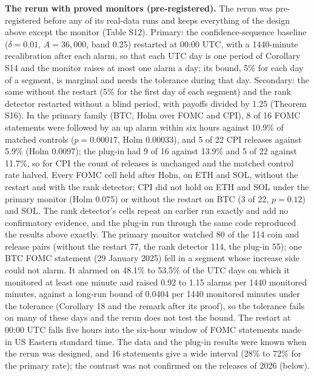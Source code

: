 \documentclass[
]{article}
\begin{document}
\textbf{The rerun with proved monitors (pre-registered).} The rerun was
pre-registered before any of its real-data runs and keeps everything of
the design above except the monitor (Table S12). Primary: the
confidence-sequence baseline (\(\delta = 0.01\), \(A = 36{,}000\), band
0.25) restarted at 00:00 UTC, with a 1440-minute recalibration after
each alarm, so that each UTC day is one period of Corollary S14 and the
monitor raises at most one alarm a day; its bound, 5\% for each day of a
segment, is marginal and needs the tolerance during that day. Secondary:
the same without the restart (5\% for the first day of each segment) and
the rank detector restarted without a blind period, with payoffs divided
by 1.25 (Theorem S16). In the primary family (BTC, Holm over FOMC and
CPI), 8 of 16 FOMC statements were followed by an up alarm within six
hours against 10.9\% of matched controls (\(p = 0.00017\), Holm
0.00033), and 5 of 22 CPI releases against 5.9\% (Holm 0.0097); the
plug-in had 9 of 16 against 13.9\% and 5 of 22 against 11.7\%, so for
CPI the count of releases is unchanged and the matched control rate
halved. Every FOMC cell held after Holm, on ETH and SOL, without the
restart and with the rank detector; CPI did not hold on ETH and SOL
under the primary monitor (Holm 0.075) or without the restart on BTC (3
of 22, \(p = 0.12\)) and SOL. The rank detector's cells repeat an
earlier run exactly and add no confirmatory evidence, and the plug-in
run through the same code reproduced the results above exactly. The
primary monitor watched 80 of the 114 coin and release pairs (without
the restart 77, the rank detector 114, the plug-in 55); one BTC FOMC
statement (29 January 2025) fell in a segment whose increase side could
not alarm. It alarmed on 48.1\% to 53.5\% of the UTC days on which it
monitored at least one minute and raised 0.92 to 1.15 alarms per 1440
monitored minutes, against a long-run bound of 0.0404 per 1440 monitored
minutes under the tolerance (Corollary 18 and the remark after its
proof), so the tolerance fails on many of these days and the rerun does
not test the bound. The restart at 00:00 UTC falls five hours into the
six-hour window of FOMC statements made in US Eastern standard time. The
data and the plug-in results were known when the rerun was designed, and
16 statements give a wide interval (28\% to 72\% for the primary rate);
the contrast was not confirmed on the releases of 2026 (below).
\end{document}

